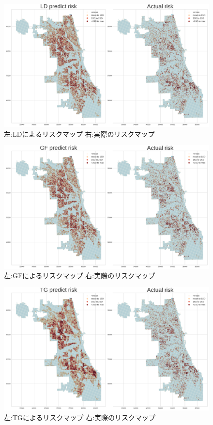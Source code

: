 \begin{figure}
  \centering %
  \includegraphics[scale=0.25]{./non-crime-timeseries-fig/LD_riskmap.png}
  \caption{左:LDによるリスクマップ 右:実際のリスクマップ}
  \label{fig:non-crime-timeseries-ld-risk}
\end{figure}

\begin{figure}
  \centering %
  \includegraphics[scale=0.25]{./non-crime-timeseries-fig/GF_riskmap.png}
  \caption{左:GFによるリスクマップ 右:実際のリスクマップ}
  \label{fig:non-crime-timeseries-gf-risk}
\end{figure}

\begin{figure}
  \centering %
  \includegraphics[scale=0.25]{./non-crime-timeseries-fig/TG_riskmap.png}
  \caption{左:TGによるリスクマップ 右:実際のリスクマップ}
  \label{fig:non-crime-timeseries-tg-risk}
\end{figure}

